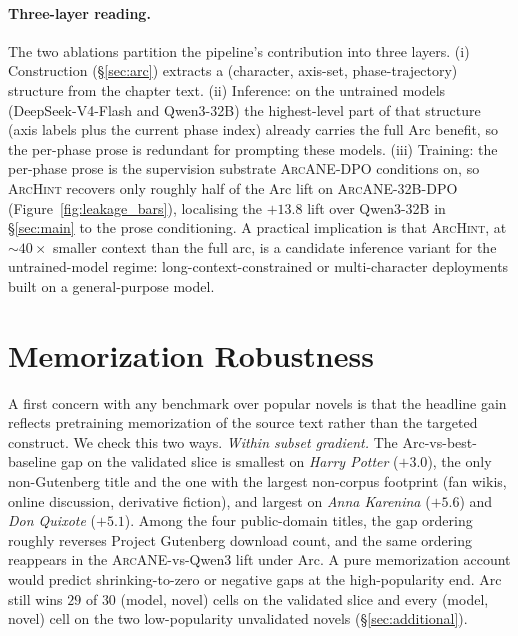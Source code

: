 \documentclass[11pt]{article}
\newcommand{\ours}{\textsc{ArcANE}}
\begin{document}
\paragraph{Three-layer reading.}
The two ablations partition the pipeline's contribution into three layers. (i) Construction (\S\ref{sec:arc}) extracts a (character, axis-set, phase-trajectory) structure from the chapter text. (ii) Inference: on the untrained models (DeepSeek-V4-Flash and Qwen3-32B) the highest-level part of that structure (axis labels plus the current phase index) already carries the full Arc benefit, so the per-phase prose is redundant for prompting these models. (iii) Training: the per-phase prose is the supervision substrate \ours{}-DPO conditions on, so \textsc{ArcHint} recovers only roughly half of the Arc lift on \ours{}-32B-DPO (Figure~\ref{fig:leakage_bars}), localising the $+13.8$ lift over Qwen3-32B in \S\ref{sec:main} to the prose conditioning. A practical implication is that \textsc{ArcHint}, at $\sim 40\times$ smaller context than the full arc, is a candidate inference variant for the untrained-model regime: long-context-constrained or multi-character deployments built on a general-purpose model.

\section{Memorization Robustness\label{app:memorization}}

A first concern with any benchmark over popular novels is that the headline gain reflects pretraining memorization of the source text rather than the targeted construct. We check this two ways. \emph{Within subset gradient.} The Arc-vs-best-baseline gap on the validated slice is smallest on \emph{Harry Potter} ($+3.0$), the only non-Gutenberg title and the one with the largest non-corpus footprint (fan wikis, online discussion, derivative fiction), and largest on \emph{Anna Karenina} ($+5.6$) and \emph{Don Quixote} ($+5.1$). Among the four public-domain titles, the gap ordering roughly reverses Project Gutenberg download count, and the same ordering reappears in the \ours{}-vs-Qwen3 lift under Arc. A pure memorization account would predict shrinking-to-zero or negative gaps at the high-popularity end. Arc still wins $29$ of $30$ (model, novel) cells on the validated slice and every (model, novel) cell on the two low-popularity unvalidated novels (\S\ref{sec:additional}).

\end{document}
